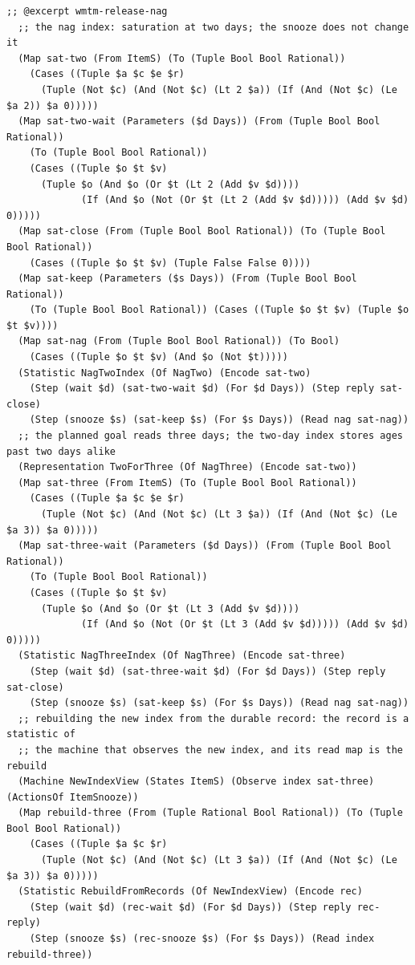 \documentclass[11pt]{article}
\theoremstyle{definition}
\theoremstyle{plain}
\begin{document}
\begin{lstlisting}[style=mettafull]
;; @excerpt wmtm-release-nag
  ;; the nag index: saturation at two days; the snooze does not change it
  (Map sat-two (From ItemS) (To (Tuple Bool Bool Rational))
    (Cases ((Tuple $a $c $e $r)
      (Tuple (Not $c) (And (Not $c) (Lt 2 $a)) (If (And (Not $c) (Le $a 2)) $a 0)))))
  (Map sat-two-wait (Parameters ($d Days)) (From (Tuple Bool Bool Rational))
    (To (Tuple Bool Bool Rational))
    (Cases ((Tuple $o $t $v)
      (Tuple $o (And $o (Or $t (Lt 2 (Add $v $d))))
             (If (And $o (Not (Or $t (Lt 2 (Add $v $d))))) (Add $v $d) 0)))))
  (Map sat-close (From (Tuple Bool Bool Rational)) (To (Tuple Bool Bool Rational))
    (Cases ((Tuple $o $t $v) (Tuple False False 0))))
  (Map sat-keep (Parameters ($s Days)) (From (Tuple Bool Bool Rational))
    (To (Tuple Bool Bool Rational)) (Cases ((Tuple $o $t $v) (Tuple $o $t $v))))
  (Map sat-nag (From (Tuple Bool Bool Rational)) (To Bool)
    (Cases ((Tuple $o $t $v) (And $o (Not $t)))))
  (Statistic NagTwoIndex (Of NagTwo) (Encode sat-two)
    (Step (wait $d) (sat-two-wait $d) (For $d Days)) (Step reply sat-close)
    (Step (snooze $s) (sat-keep $s) (For $s Days)) (Read nag sat-nag))
  ;; the planned goal reads three days; the two-day index stores ages past two days alike
  (Representation TwoForThree (Of NagThree) (Encode sat-two))
  (Map sat-three (From ItemS) (To (Tuple Bool Bool Rational))
    (Cases ((Tuple $a $c $e $r)
      (Tuple (Not $c) (And (Not $c) (Lt 3 $a)) (If (And (Not $c) (Le $a 3)) $a 0)))))
  (Map sat-three-wait (Parameters ($d Days)) (From (Tuple Bool Bool Rational))
    (To (Tuple Bool Bool Rational))
    (Cases ((Tuple $o $t $v)
      (Tuple $o (And $o (Or $t (Lt 3 (Add $v $d))))
             (If (And $o (Not (Or $t (Lt 3 (Add $v $d))))) (Add $v $d) 0)))))
  (Statistic NagThreeIndex (Of NagThree) (Encode sat-three)
    (Step (wait $d) (sat-three-wait $d) (For $d Days)) (Step reply sat-close)
    (Step (snooze $s) (sat-keep $s) (For $s Days)) (Read nag sat-nag))
  ;; rebuilding the new index from the durable record: the record is a statistic of
  ;; the machine that observes the new index, and its read map is the rebuild
  (Machine NewIndexView (States ItemS) (Observe index sat-three) (ActionsOf ItemSnooze))
  (Map rebuild-three (From (Tuple Rational Bool Rational)) (To (Tuple Bool Bool Rational))
    (Cases ((Tuple $a $c $r)
      (Tuple (Not $c) (And (Not $c) (Lt 3 $a)) (If (And (Not $c) (Le $a 3)) $a 0)))))
  (Statistic RebuildFromRecords (Of NewIndexView) (Encode rec)
    (Step (wait $d) (rec-wait $d) (For $d Days)) (Step reply rec-reply)
    (Step (snooze $s) (rec-snooze $s) (For $s Days)) (Read index rebuild-three))

\end{lstlisting}
\end{document}
